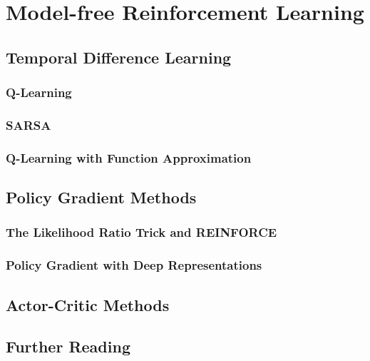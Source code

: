 \chapter{Model-free Reinforcement Learning}

\section{Temporal Difference Learning}

\subsection{Q-Learning}

\subsection{SARSA}

\subsection{Q-Learning with Function Approximation}


\section{Policy Gradient Methods}

\subsection{The Likelihood Ratio Trick and REINFORCE}

\subsection{Policy Gradient with Deep Representations}




\section{Actor-Critic Methods}


\section{Further Reading}

